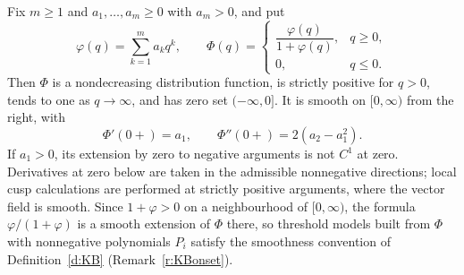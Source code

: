 Fix $m\ge1$ and $a_1,\ldots,a_m\ge0$ with $a_m>0$, and put
\begin{equation}\label{eq:oddsFamily}
 \varphi(q)=\sum_{k=1}^m a_kq^k,\qquad
 \Phi(q)=\begin{cases}\dfrac{\varphi(q)}{1+\varphi(q)},&q\ge0,\\[4pt] 0,&q\le0.\end{cases}
\end{equation}
Then $\Phi$ is a nondecreasing distribution function, is strictly positive
for $q>0$, tends to one as $q\to\infty$, and has zero set $(-\infty,0]$.
It is smooth on $[0,\infty)$ from the right, with
\[
 \Phi'(0+)=a_1,\qquad \Phi''(0+)=2(a_2-a_1^2).
\]
If $a_1>0$, its extension by zero to negative arguments is not $C^1$ at
zero. Derivatives at zero below are taken in the admissible nonnegative
directions; local cusp calculations are performed at strictly
positive arguments, where the vector field is smooth. Since $1+\varphi>0$ on a
neighbourhood of $[0,\infty)$, the formula $\varphi/(1+\varphi)$ is a smooth
extension of $\Phi$ there, so threshold models built from $\Phi$ with nonnegative
polynomials $P_i$ satisfy the smoothness convention of Definition~\ref{d:KB}
(Remark~\ref{r:KBonset}).
\eeD

